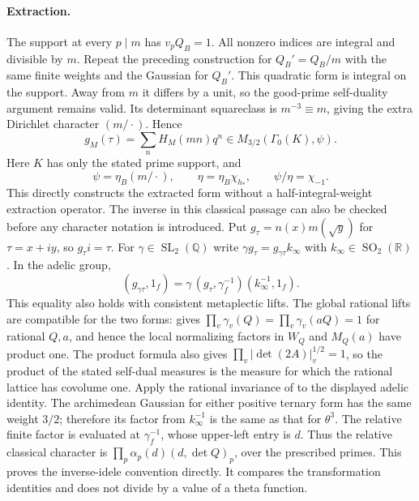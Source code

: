 \paragraph{Extraction.}
The support at every $p\mid m$ has $v_pQ_B=1$.  All nonzero
indices are integral and divisible by $m$.  Repeat the preceding
construction for $Q_B'=Q_B/m$ with the same finite weights and the
Gaussian for $Q_B'$.  This quadratic form is integral on the
support.  Away from $m$ it differs by a unit, so the good-prime
self-duality argument remains valid.  Its determinant squareclass
is $m^{-3}\equiv m$, giving the extra Dirichlet character
$(m/\cdot)$.  Hence
\[
 g_M(\tau)=\sum_n H_M(mn)q^n\in
      M_{3/2}(\Gamma_0(K),\psi).
\]
Here $K$ has only the stated prime support, and
\[
 \psi=\eta_B(m/\cdot),\qquad
 \eta=\eta_B\chi_{h_*},\qquad
 \psi/\eta=\chi_{-1}. \tag{O.5}
\]
This directly constructs the extracted form without a
half-integral-weight extraction operator.
The inverse in this classical passage can also be checked before
any character notation is introduced. Put
$g_\tau=n(x)m(\sqrt y)$ for $\tau=x+iy$, so $g_\tau i=\tau$.
For $\gamma\in\operatorname{SL}_2(\mathbb Q)$ write
$\gamma g_\tau=g_{\gamma\tau}k_\infty$ with
$k_\infty\in\operatorname{SO}_2(\mathbb R)$. In the adelic group,
\[
 (g_{\gamma\tau},1_f)
   =\gamma\,(g_\tau,\gamma_f^{-1})(k_\infty^{-1},1_f).
\]
This equality also holds with consistent metaplectic lifts.
The global rational lifts are compatible for the two forms:
\cite[II.30, Proposition~5]{weil} gives
$\prod_v\gamma_v(Q)=\prod_v\gamma_v(aQ)=1$ for rational $Q,a$,
and hence the local normalizing factors in $W_Q$ and $M_Q(a)$
have product one. The product formula also gives
$\prod_v|\det(2A)|_v^{1/2}=1$, so the product of the stated
self-dual measures is the measure for which the rational lattice
has covolume one. Apply the rational invariance of
\cite[III.41, Theorem~6]{weil} to the displayed adelic identity.
The archimedean Gaussian for either positive ternary form has
the same weight $3/2$; therefore its factor from $k_\infty^{-1}$
is the same as that for $\theta^3$. The relative finite factor
is evaluated at $\gamma_f^{-1}$, whose upper-left entry is $d$.
Thus the relative classical character is
$\prod_p\alpha_p(d)(d,\det Q)_p$, over the prescribed primes.
This proves the inverse-idele convention directly. It compares
the transformation identities and does not divide by a value
of a theta function.

